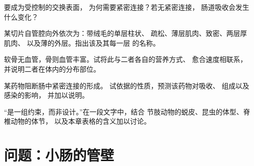 \begin{exercise}[$\star\star$]\label{exo:b1:body-plans-tissues:8}
要成为受控制的交换表面，
为何需要紧密连接？若无紧密连接，
肠道吸收会发生什么变化？
\end{exercise}

\begin{exercise}[$\star\star$]\label{exo:b1:body-plans-tissues:9}
某切片自管腔向外依次为：带绒毛的单层柱状、
疏松、薄层肌肉、致密、两层厚肌肉、
以及薄的外层。指出该及其每一层
的名称。
\end{exercise}

\begin{exercise}[$\star\star\star$]\label{exo:b1:body-plans-tissues:10}
软骨无血管，骨则血管丰富。试将此与二者各自的营养方式、
愈合速度相联系，
并说明二者在体内的分布部位。
\end{exercise}

\begin{exercise}[$\star\star\star$]\label{exo:b1:body-plans-tissues:11}
某药物阻断肠中紧密连接的形成。
试依据的性质，预测该药物对吸收、
组成以及感染的影响，
并加以说明。
\end{exercise}

\begin{exercise}[$\star\star\star$]\label{exo:b1:body-plans-tissues:12}
“是一组约束，而非设计。”在一段文字中，结合
节肢动物的蜕皮、昆虫的体型、脊椎动物的体节，
以及本章表格的含义加以讨论。
\end{exercise}

\section{问题：小肠的管壁}

